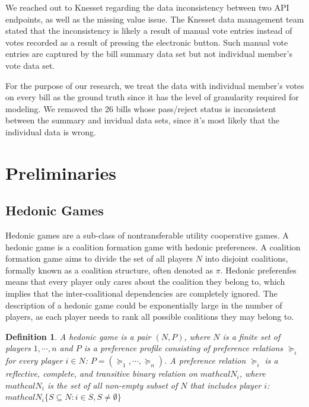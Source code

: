 \documentclass[letterpaper]{article} %
\newtheorem{definition}{Definition}
\begin{document}
We reached out to Knesset regarding the data inconsistency between two API endpoints, as well as the missing value issue. The Knesset data management team stated that the inconsistency is likely a result of manual vote entries instead of votes recorded as a result of pressing the electronic button. Such manual vote entries are captured by the bill summary data set but not individual member's vote data set.

For the purpose of our research, we treat the data with individual member's votes on every bill as the ground truth since it has the level of granularity required for modeling.  We removed the 26 bills whose pass/reject status is inconsistent between the summary and invidual data sets, since it's most likely that the individual data is wrong.

\section{Preliminaries}

\subsection{Hedonic Games}
Hedonic games are a sub-class of nontransferable utility cooperative games. A hedonic game is a coalition formation game with hedonic preferences. A coalition formation game aims to divide the set of all players $N$ into disjoint coalitions, formally known as a coalition structure, often denoted as $\pi$. Hedonic preferenfes means that every player only cares about the coalition they belong to, which implies that the inter-coalitional dependencies are completely ignored. The description of a hedonic game could be exponentially large in the number of players, as each player needs to rank all possible coalitions they may belong to.

\begin{definition}
  A {\it hedonic game} is a pair $(N, P)$, where $N$ is a finite set of players $1, \cdots, n$ and $P$ is a {\it preference profile} consisting of preference relations $\succeq_i$ for every player $i \in N$: $P = (\succeq_1, \cdots, \succeq_n)$. A {\it preference relation} $\succeq_i$ is a reflective, complete, and transitive binary relation on $mathcal{N}_i$, where $mathcal{N}_i$ is the set of all non-empty subset of $N$ that includes player $i$: $mathcal{N}_i \{S \subseteq N: i \in S, S \neq \emptyset \}$
\end{definition}
\end{document}

